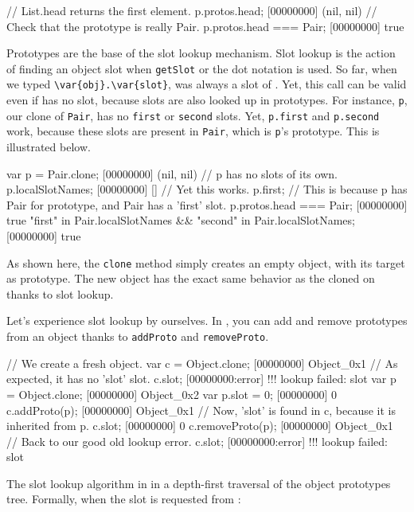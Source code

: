 \begin{urbiscript}[firstnumber=last]
// List.head returns the first element.
p.protos.head;
[00000000] (nil, nil)
// Check that the prototype is really Pair.
p.protos.head === Pair;
[00000000] true
\end{urbiscript}

Prototypes are the base of the slot lookup mechanism. Slot lookup is
the action of finding an object slot when \lstinline{getSlot} or the
dot notation is used. So far, when we typed
\lstinline|\var{obj}.\var{slot}|,  was always a slot of
.  Yet, this call can be valid even if  has no
 slot, because slots are also looked up in prototypes. For
instance, \lstinline|p|, our clone of \lstinline|Pair|, has no
\lstinline|first| or \lstinline|second| slots. Yet,
\lstinline|p.first| and \lstinline|p.second| work, because these slots
are present in \lstinline|Pair|, which is \lstinline|p|'s
prototype. This is illustrated below.

\begin{urbiscript}
var p = Pair.clone;
[00000000] (nil, nil)
// p has no slots of its own.
p.localSlotNames;
[00000000] []
// Yet this works.
p.first;
// This is because p has Pair for prototype, and Pair has a 'first' slot.
p.protos.head === Pair;
[00000000] true
"first" in Pair.localSlotNames && "second" in Pair.localSlotNames;
[00000000] true
\end{urbiscript}

As shown here, the \lstinline{clone} method simply creates an empty
object, with its target as prototype. The new object has the exact
same behavior as the cloned on thanks to slot lookup.

Let's experience slot lookup by ourselves. In \us, you can add and
remove prototypes from an object thanks to \lstinline{addProto} and
\lstinline{removeProto}.

\begin{urbiscript}
// We create a fresh object.
var c = Object.clone;
[00000000] Object_0x1
// As expected, it has no 'slot' slot.
c.slot;
[00000000:error] !!! lookup failed: slot
var p = Object.clone;
[00000000] Object_0x2
var p.slot = 0;
[00000000] 0
c.addProto(p);
[00000000] Object_0x1
// Now, 'slot' is found in c, because it is inherited from p.
c.slot;
[00000000] 0
c.removeProto(p);
[00000000] Object_0x1
// Back to our good old lookup error.
c.slot;
[00000000:error] !!! lookup failed: slot
\end{urbiscript}

The slot lookup algorithm in \us in a depth-first traversal of the
object prototypes tree. Formally, when the  slot is requested
from :

